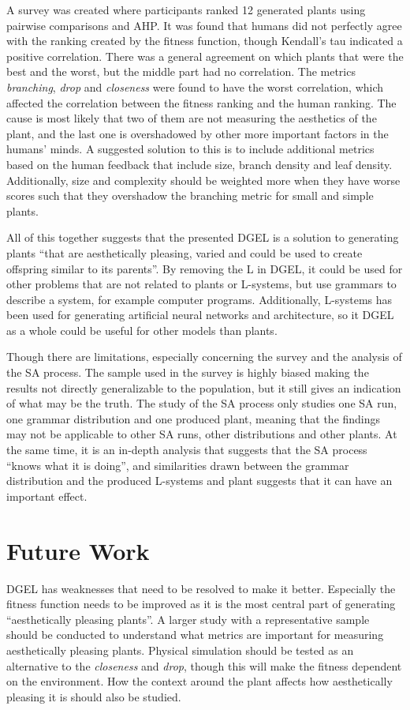 A survey was created where participants ranked 12 generated plants using pairwise comparisons and AHP.
It was found that humans did not perfectly agree with the ranking created by the fitness function, though Kendall's tau indicated a positive correlation.
There was a general agreement on which plants that were the best and the worst, but the middle part had no correlation.
The metrics \textit{branching}, \textit{drop} and \textit{closeness} were found to have the worst correlation, which affected the correlation between the fitness ranking and the human ranking.
The cause is most likely that two of them are not measuring the aesthetics of the plant, and the last one is overshadowed by other more important factors in the humans' minds.
A suggested solution to this is to include additional metrics based on the human feedback that include size, branch density and leaf density.
Additionally, size and complexity should be weighted more when they have worse scores such that they overshadow the branching metric for small and simple plants.

All of this together suggests that the presented DGEL is a solution to generating plants ``that are aesthetically pleasing, varied and could be used to create offspring similar to its parents''.
By removing the L in DGEL, it could be used for other problems that are not related to plants or L-systems, but use grammars to describe a system, for example computer programs.
Additionally, L-systems has been used for generating artificial neural networks and architecture, so it DGEL as a whole could be useful for other models than plants.

Though there are limitations, especially concerning the survey and the analysis of the SA process.
The sample used in the survey is highly biased making the results not directly generalizable to the population, but it still gives an indication of what may be the truth.
The study of the SA process only studies one SA run, one grammar distribution and one produced plant, meaning that the findings may not be applicable to other SA runs, other distributions and other plants.
At the same time, it is an in-depth analysis that suggests that the SA process ``knows what it is doing'', and similarities drawn between the grammar distribution and the produced L-systems and plant suggests that it can have an important effect.

\section{Future Work}
DGEL has weaknesses that need to be resolved to make it better.
Especially the fitness function needs to be improved as it is the most central part of generating ``aesthetically pleasing plants''.
A larger study with a representative sample should be conducted to understand what metrics are important for measuring aesthetically pleasing plants.
Physical simulation should be tested as an alternative to the \textit{closeness} and \textit{drop}, though this will make the fitness dependent on the environment.
How the context around the plant affects how aesthetically pleasing it is should also be studied.

